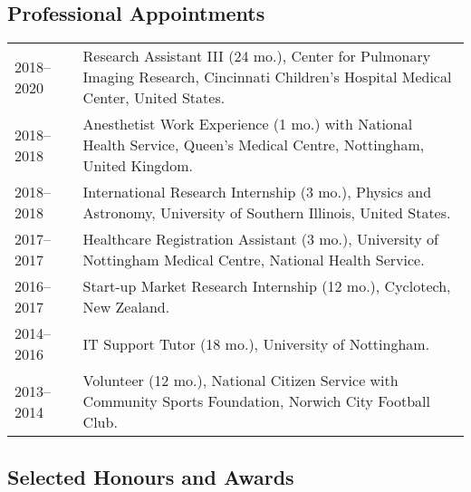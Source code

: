 \documentclass[12pt,]{scrartcl}
\begin{document}
\subsection{Professional Appointments}\label{appointments}

\begin{table}[h!]
{\def\arraystretch{1.5}\tabcolsep=0pt
\begin{tabular}{p{0.15\linewidth}p{0.85\linewidth}}

  2018--2020 & Research Assistant III (24 mo.), Center for Pulmonary Imaging Research, Cincinnati Children's Hospital Medical Center, United States. \\
  
  2018--2018 & Anesthetist Work Experience (1 mo.) with National Health Service, Queen's Medical Centre, Nottingham, United Kingdom. \\
  
  2018--2018 & International Research Internship (3 mo.), Physics and Astronomy, University of Southern Illinois, United States. \\
  
  2017--2017 & Healthcare Registration Assistant (3 mo.), University of Nottingham Medical Centre, National Health Service.  \\
  
  2016--2017 & Start-up Market Research Internship (12 mo.), Cyclotech, New Zealand.  \\

  2014--2016 & IT Support Tutor (18 mo.), University of Nottingham. \\
  
  2013--2014 & Volunteer (12 mo.), National Citizen Service with Community Sports Foundation,  Norwich City Football Club. 
\end{tabular}%
}
\end{table}

\newpage

\subsection{Selected Honours and
Awards}\label{selected-honours-and-awards}
\end{document}
